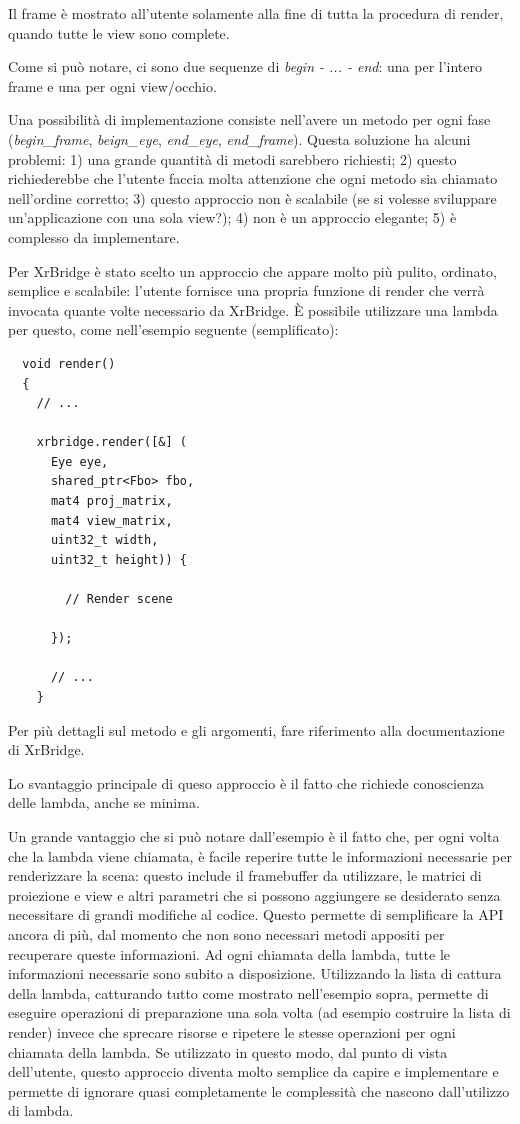 \documentclass[twoside]{supsistudent}
\begin{document}
Il frame è mostrato all'utente solamente alla fine di tutta la procedura di render, quando tutte le view sono complete.

Come si può notare, ci sono due sequenze di \textit{begin - ... - end}: una per l'intero frame e una per ogni view/occhio.

Una possibilità di implementazione consiste nell'avere un metodo per ogni fase (\textit{begin\_frame}, \textit{beign\_eye}, \textit{end\_eye}, \textit{end\_frame}). Questa soluzione ha alcuni problemi: 1) una grande quantità di metodi sarebbero richiesti; 2) questo richiederebbe che l'utente faccia molta attenzione che ogni metodo sia chiamato nell'ordine corretto; 3) questo approccio non è scalabile (se si volesse sviluppare un'applicazione con una sola view?); 4) non è un approccio elegante; 5) è complesso da implementare.

Per XrBridge è stato scelto un approccio che appare molto più pulito, ordinato, semplice e scalabile: l'utente fornisce una propria funzione di render che verrà invocata quante volte necessario da XrBridge. È possibile utilizzare una lambda per questo, come nell'esempio seguente (semplificato):

\begin{verbatim}
  void render()
  {
    // ...

    xrbridge.render([&] (
      Eye eye,
      shared_ptr<Fbo> fbo,
      mat4 proj_matrix,
      mat4 view_matrix,
      uint32_t width,
      uint32_t height)) {

        // Render scene

      });

      // ...
    }
\end{verbatim}

Per più dettagli sul metodo e gli argomenti, fare riferimento alla documentazione di XrBridge.

Lo svantaggio principale di queso approccio è il fatto che richiede conoscienza delle lambda, anche se minima.

Un grande vantaggio che si può notare dall'esempio è il fatto che, per ogni volta che la lambda viene chiamata, è facile reperire tutte le informazioni necessarie per renderizzare la scena: questo include il framebuffer da utilizzare, le matrici di proiezione e view e altri parametri che si possono aggiungere se desiderato senza necessitare di grandi modifiche al codice. Questo permette di semplificare la API ancora di più, dal momento che non sono necessari metodi appositi per recuperare queste informazioni. Ad ogni chiamata della lambda, tutte le informazioni necessarie sono subito a disposizione. Utilizzando la lista di cattura della lambda, catturando tutto come mostrato nell'esempio sopra, permette di eseguire operazioni di preparazione una sola volta (ad esempio costruire la lista di render) invece che sprecare risorse e ripetere le stesse operazioni per ogni chiamata della lambda. Se utilizzato in questo modo, dal punto di vista dell'utente, questo approccio diventa molto semplice da capire e implementare e permette di ignorare quasi completamente le complessità che nascono dall'utilizzo di lambda.
\end{document}
